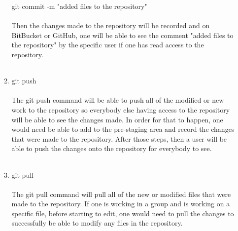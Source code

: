 \documentclass{article}
\begin{document}
\begin{enumerate}
\begin{enumerate}
git commit -m "added files to the repository"
\\
\\
Then the changes made to the repository will be recorded and on BitBucket or GitHub, one will be able to see the comment "added files to the repository" by the specific user if one has read access to the repository.
\\
\\
\item {git push}
\\
\\
The git push command will be able to push all of the modified or new work to the repository so everybody else having access to the repository will be able to see the changes made. In order for that to happen, one would need be able to add to the pre-staging area and record the changes that were made to the repository. After those steps, then a user will be able to push the changes onto the repository for everybody to see.
\\
\\
\item {git pull}
\\
\\
The git pull command will pull all of the new or modified files that were made to the repository. If one is working in a group and is working on a specific file, before starting to edit, one would need to pull the changes to successfully be able to modify any files in the repository.  
\end{enumerate}
\end{enumerate}
\end{document}
